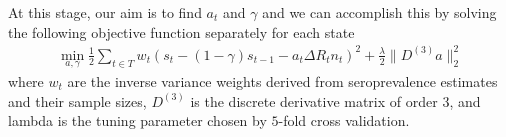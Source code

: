 \documentclass{article}
\begin{document}
At this stage, our aim is to find $a_t$ and $\gamma$ and we can accomplish this by solving the following objective function separately for each state
\begin{align*}
\min_{a, \gamma}\frac{1}{2}\sum_{t \in T}w_t\left (s_t - (1 -\gamma)s_{t-1} -a_t\Delta R_t n_t  \right )^2 + \frac{\lambda}{2} \|D^{(3)}a\|_2^2 
\end{align*}
where $w_t$ are the inverse variance weights derived from seroprevalence estimates and their sample sizes, $D^{(3)}$ is the discrete derivative matrix of order $3$, and lambda is the tuning parameter chosen by $5$-fold cross validation. 





\end{document}
